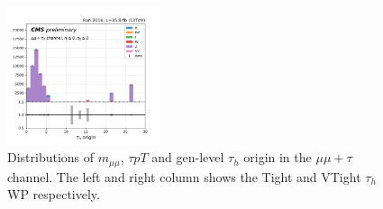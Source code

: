 \begin{figure}
    \includegraphics[width=0.4\textwidth]{chapters/Appendix/sectionJetToTauh/figures/mumutau_tauGenFlavor_pickles_lltauVTight.png}
    \caption{Distributions of $m_{\mu\mu}$, $\tau pT$ and gen-level $\tau_h$ origin in the $\mu\mu+\tau$ channel. The left and right column shows the Tight and VTight $\tau_h$ WP respectively.}
    \label{fig:appendix:fakeTauId:mumutau}
\end{figure}


